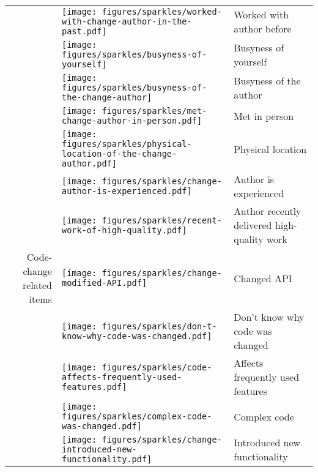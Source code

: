 \begin{table}[t!]
\begin{tabular}{rll}
&\vspace{-2pt}\texttt{[image: figures/sparkles/worked-with-change-author-in-the-past.pdf]} & Worked with author before\\
&\vspace{-2pt}\texttt{[image: figures/sparkles/busyness-of-yourself]} & Busyness of yourself\\
&\vspace{-2pt}\texttt{[image: figures/sparkles/busyness-of-the-change-author]} & Busyness of the author\\
&\vspace{-2pt}\texttt{[image: figures/sparkles/met-change-author-in-person.pdf]} & Met in person\\
&\vspace{-2pt}\texttt{[image: figures/sparkles/physical-location-of-the-change-author.pdf]} & Physical location\\
&\vspace{-2pt}\texttt{[image: figures/sparkles/change-author-is-experienced.pdf]} & Author is experienced\\
&\vspace{-2pt}\texttt{[image: figures/sparkles/recent-work-of-high-quality.pdf]} & Author recently delivered high-quality work\\
\midrule
Code-change related items&\vspace{-2pt}\texttt{[image: figures/sparkles/change-modified-API.pdf]} & Changed API\\
&\vspace{-2pt}\texttt{[image: figures/sparkles/don-t-know-why-code-was-changed.pdf]} & Don't know why code was changed\\
&\vspace{-2pt}\texttt{[image: figures/sparkles/code-affects-frequently-used-features.pdf]} & Affects frequently used features\\
&\vspace{-2pt}\texttt{[image: figures/sparkles/complex-code-was-changed.pdf]} & Complex code\\
&\vspace{-2pt}\texttt{[image: figures/sparkles/change-introduced-new-functionality.pdf]} & Introduced new functionality\\

\end{tabular}
\end{table}
